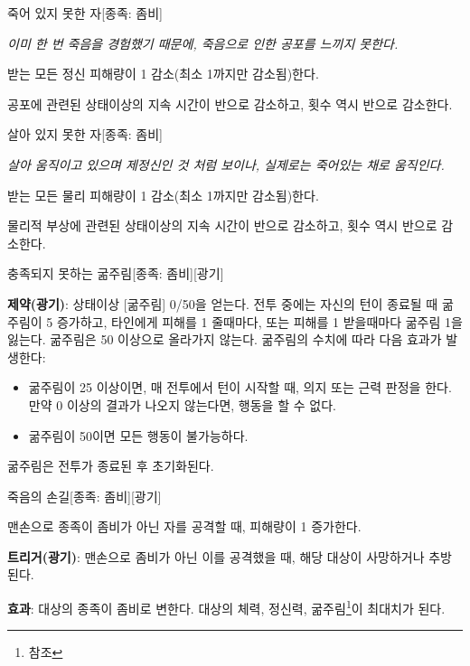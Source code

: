 \documentclass{report}
\begin{document}
	\begin{story}{죽어 있지 못한 자}{[종족: 좀비]}
		
		\textit{이미 한 번 죽음을 경험했기 때문에, 죽음으로 인한 공포를 느끼지 못한다.}
		
		받는 모든 정신 피해량이 1 감소(최소 1까지만 감소됨)한다.
		
		공포에 관련된 상태이상의 지속 시간이 반으로 감소하고, 횟수 역시 반으로 감소한다.
		
		\smallskip
		
	\end{story}
	
	\begin{story}{살아 있지 못한 자}{[종족: 좀비]}
		
		\textit{살아 움직이고 있으며 제정신인 것 처럼 보이나, 실제로는 죽어있는 채로 움직인다.}
		
		받는 모든 물리 피해량이 1 감소(최소 1까지만 감소됨)한다.
		
		물리적 부상에 관련된 상태이상의 지속 시간이 반으로 감소하고, 횟수 역시 반으로 감소한다.
		
	\end{story}
	
	\begin{story}{충족되지 못하는 굶주림}{[종족: 좀비][광기]}
		
		\textbf{제약(광기)}: 상태이상 [굶주림] 0/50을 얻는다. 전투 중에는 자신의 턴이 종료될 때 굶주림이 5 증가하고, 타인에게 피해를 1 줄때마다, 또는 피해를 1 받을때마다 굶주림 1을 잃는다. 굶주림은 50 이상으로 올라가지 않는다. 굶주림의 수치에 따라 다음 효과가 발생한다:
		\begin{itemize}
			\item 굶주림이 25 이상이면, 매 전투에서 턴이 시작할 때, 의지 또는 근력 판정을 한다. 만약 0 이상의 결과가 나오지 않는다면, 행동을 할 수 없다.
			\item 굶주림이 50이면 모든 행동이 불가능하다.
		\end{itemize}
		굶주림은 전투가 종료된 후 초기화된다.
		
	\end{story}
	
	\begin{story}{죽음의 손길}{[종족: 좀비][광기]}
		
		맨손으로 종족이 좀비가 아닌 자를 공격할 때, 피해량이 1 증가한다.
		
		\textbf{트리거(광기)}: 맨손으로 좀비가 아닌 이를 공격했을 때, 해당 대상이 사망하거나 추방된다.
		
		\textbf{효과}: 대상의 종족이 좀비로 변한다. 대상의 체력, 정신력, 굶주림\footnote{ 참조}이 최대치가 된다.
		
	\end{story}
\end{document}
